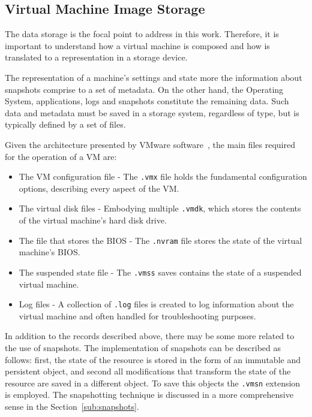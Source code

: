 \nocite{Nuno2016}
\nocite{Eduardo2016}
\nocite{P2020}


\subsection{Virtual Machine Image Storage} %
\label{sub:vm_storage}

The data storage is the focal point to address in this work. Therefore, it is important to understand how a virtual machine is composed and how is translated to a representation in a storage device.

The representation of a machine's settings and state more the information about snapshots comprise to a set of metadata. On the other hand, the Operating System, applications, logs and snapshots constitute the remaining data. Such data and metadata must be saved in a storage system, regardless of type, but is typically defined by a set of files. 

Given the architecture presented by VMware software~\cite{VMWare_VMFiles}, the main files required for the operation of a VM are:

\begin{itemize}
	\item The VM configuration file - The \texttt{.vmx} file holds the fundamental configuration options, describing every aspect of the VM.
	\item The virtual disk files - Embodying multiple \texttt{.vmdk}, which stores the contents of the virtual machine's hard disk drive.
	\item The file that stores the BIOS - The \texttt{.nvram} file stores the state of the virtual machine's BIOS.
	\item The suspended state file - The \texttt{.vmss} saves contains the state of a suspended virtual machine.
	\item Log files - A collection of \texttt{.log} files is created to log information about the virtual machine and often handled for troubleshooting purposes.
\end{itemize}


In addition to the records described above, there may be some more related to the use of snapshots. The implementation of snapshots can be described as follows: first, the state of the resource is stored in the form of an immutable and persistent object, and second all modifications that transform the state of the resource are saved in a different object. To save this objects the \texttt{.vmsn} extension is employed.
The snapshotting technique is discussed in a more comprehensive sense in the Section~\ref{sub:snapshots}.


